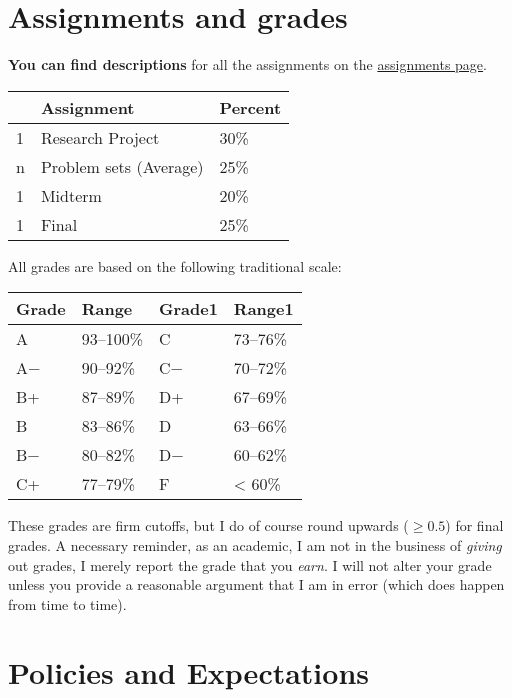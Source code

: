 \documentclass{article}
\begin{document}
\hypertarget{assignments-and-grades}{%
\section{Assignments and grades}\label{assignments-and-grades}}

\textbf{You can find descriptions} for all the assignments on the
\href{http://metricsf19.classes.ryansafner.com/assignments/}{assignments
page}.

\begin{center}

\begin{tabular}{lll}
\toprule
 & Assignment & Percent\\
\midrule
1 & Research Project & 30\%\\
n & Problem sets (Average) & 25\%\\
1 & Midterm & 20\%\\
1 & Final & 25\%\\
\bottomrule
\end{tabular}
\end{center}

All grades are based on the following traditional scale:

\begin{center}

\begin{tabular}{llll}
\toprule
Grade & Range & Grade1 & Range1\\
\midrule
A & 93–100\% & C & 73–76\%\\
A− & 90–92\% & C− & 70–72\%\\
B+ & 87–89\% & D+ & 67–69\%\\
B & 83–86\% & D & 63–66\%\\
B− & 80–82\% & D− & 60–62\%\\
\addlinespace
C+ & 77–79\% & F & < 60\%\\
\bottomrule
\end{tabular}
\end{center}

These grades are firm cutoffs, but I do of course round upwards
(\(\geq 0.5\)) for final grades. A necessary reminder, as an academic, I
am not in the business of \emph{giving} out grades, I merely report the
grade that you \emph{earn}. I will not alter your grade unless you
provide a reasonable argument that I am in error (which does happen from
time to time).

\hypertarget{policies-and-expectations}{%
\section{Policies and Expectations}\label{policies-and-expectations}}
\end{document}
